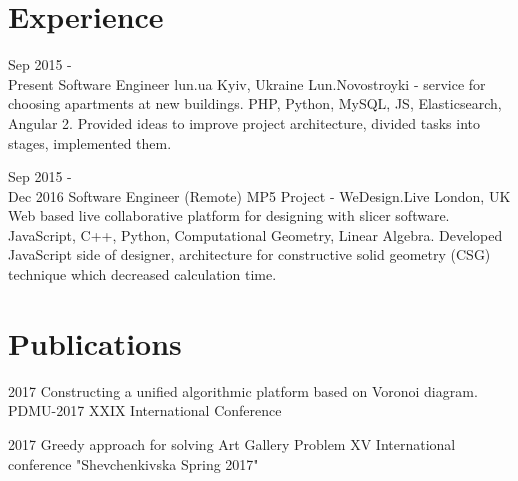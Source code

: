 \documentclass[letterpaper]{twentysecondcv} %
\begin{document}
\section{Experience}

\begin{twenty} %
	\twentyitem
    	{Sep 2015 - \\Present}
        {Software Engineer}
        {lun.ua}
        {Kyiv, Ukraine}
        {Lun.Novostroyki - service for choosing apartments at new buildings.
        {PHP, Python, MySQL, JS, Elasticsearch, Angular 2. Provided ideas to improve project architecture, divided tasks into stages, implemented them.
        }
    }

    \twentyitem
   	{Sep 2015 - \\Dec 2016}
        {Software Engineer (Remote)}
        {MP5 Project - WeDesign.Live}
        {London, UK}
        {Web based live collaborative platform for designing with slicer software.
        {JavaScript, C++, Python, Computational Geometry, Linear Algebra. Developed JavaScript side of designer, architecture for constructive solid geometry (CSG) technique which decreased calculation time.
        }
        }
\end{twenty}
\section{Publications}
\begin{twenty}
	\twentyitemwithoutend
    	{2017}
        {Constructing a unified algorithmic platform based on Voronoi diagram.}
        {}
        {PDMU-2017 XXIX International Conference}
        {}
        \end{twenty}
\begin{twenty}
	\twentyitemwithoutend
    	{2017}
        {Greedy approach for solving Art Gallery Problem}
        {}
        {XV International conference "Shevchenkivska Spring 2017"}
        {}
\end{twenty}
\end{document}
